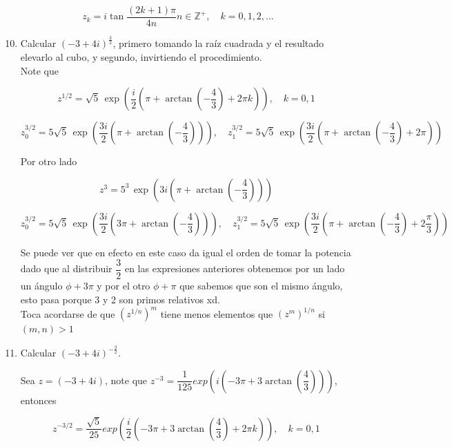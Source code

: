 \documentclass[11pt]{article}
\begin{document}
$$
z_{k}=i \tan \frac{(2 k+1) \pi}{4 n} n \in \mathbb{Z}^{+}, \quad k=0,1,2, \ldots
$$

\begin{enumerate}
  \setcounter{enumi}{9}
  \item Calcular $(-3+4 i)^{\frac{3}{2}}$, primero tomando la raíz cuadrada y el resultado elevarlo al cubo, y segundo, invirtiendo el procedimiento.\\

  Note que

$$z^{1/2} = \sqrt{5} \, \exp \left( \frac{i}{2} \left( \pi + \arctan \left( -\frac{4}{3} \right) + 2 \pi k \right) \right), \quad k = 0, 1$$

$$z_0^{3/2}= 5 \sqrt{5} \, \exp \left( \frac{3i}{2} \left( \pi + \arctan \left( -\frac{4}{3} \right) \right) \right), \quad z_1^{3/2} = 5 \sqrt{5} \, \exp \left( \frac{3i}{2} \left( \pi + \arctan \left( -\frac{4}{3} \right) + 2 \pi \right) \right)$$

Por otro lado

$$z^3 = 5^3 \, \exp \left( 3i \left( \pi + \arctan \left( -\frac{4}{3} \right) \right) \right)$$

$$z_0^{3/2}= 5 \sqrt{5} \, \exp \left( \frac{3i}{2} \left( 3 \pi + \arctan \left( -\frac{4}{3} \right) \right) \right),\quad z_1^{3/2} = 5 \sqrt{5} \, \exp \left( \frac{3i}{2} \left( \pi + \arctan \left( -\frac{4}{3} \right) + 2 \frac{\pi}{3} \right) \right)
$$

Se puede ver que en efecto en este caso da igual el orden de tomar la potencia dado que al distribuir $\dfrac{3}{2}$ en las expresiones anteriores obtenemos por un lado un ángulo $\phi+3\pi$ y por el otro $\phi+\pi$ que sabemos que son el mismo ángulo, esto pasa  porque 3 y 2 son primos relativos xd.\\

Toca acordarse de que $\left(z^{1/n}\right)^m$ tiene menos elementos que $\left(z^{m}\right)^{1/n}$ si $(m,n)> 1$

  \item Calcular $(-3+4 i)^{-\frac{3}{2}}$.

  Sea $z=(-3+4i)$, note que $z^{-3}=\dfrac{1}{125} exp\left( i \left(-3\pi +3\arctan\left(\dfrac{4}{3}\right)\right)\right)$, entonces


$$z^{-3/2}=\dfrac{\sqrt{5} }{25} exp\left( \frac{i}{2} \left(-3\pi +3\arctan\left(\dfrac{4}{3}\right)+2\pi k\right)\right), \quad k=0,1$$
\end{enumerate}
\end{document}
